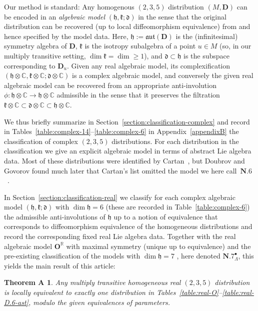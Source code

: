 \documentclass[10pt,a4paper]{amsart}
\newtheorem*{theoremA}{Theorem A}
\newcommand{\bbC}{\mathbb{C}}
\newcommand{\bbR}{\mathbb{R}}
\newcommand{\mbD}{\mathbf{D}}
\newcommand{\mbO}{\mathbf{O}}
\newcommand{\mfd} {\mathfrak{d}}
\newcommand{\mfh} {\mathfrak{h}}
\newcommand{\mfk} {\mathfrak{k}}
\newcommand{\mfaut}{\mathfrak{aut}}
\numberwithin{equation}{section}
\begin{document}
Our method is standard: Any homogenous $(2, 3, 5)$ distribution $(M, \mbD)$ can be encoded in an \textit{algebraic model} $(\mfh, \mfk; \mfd)$ in the sense that the original distribution can be recovered (up to local diffeomorphism equivalence) from and hence specified by the model data. Here, $\mfh := \mfaut(\mbD)$ is the (infinitesimal) symmetry algebra of $\mbD$, $\mfk$ is the isotropy subalgebra of a point $u \in M$ (so, in our multiply transitive setting, $\dim \mfk = \dim \geq 1$), and $\mfd \subset \mfh$ is the subspace corresponding to $\mbD_u$. Given any real algebraic model, its complexification $(\mfh \otimes \bbC, \mfk \otimes \bbC; \mfd \otimes \bbC)$ is a complex algebraic model, and conversely the given real algebraic model can be recovered from an appropriate anti-involution $\phi\colon \mfh \otimes \bbC \to \mfh \otimes \bbC$ admissible in the sense that it preserves the filtration $\mfk \otimes \bbC \subset \mfd \otimes \bbC \subset \mfh \otimes \bbC$.

We thus briefly summarize in Section~\ref{section:classification-complex} and record in Tables~\ref{table:complex-14}--\ref{table:complex-6} in Appendix~\ref{appendixB} the classification of complex $(2, 3, 5)$ distributions. For each distribution in the classification we give an explicit algebraic model in terms of abstract Lie algebra data. Most of these distributions were identified by Cartan~\cite{CartanFiveVariables}, but Doubrov and Govorov found much later that Cartan's list omitted the model we here call~$\mathbf{N.6}$~\cite{DoubrovGovorovCounterexample}.

In Section~\ref{section:classification-real} we classify for each complex algebraic model $(\mfh, \mfk; \mfd)$ with $\dim \mfh = 6$ (these are recorded in Table~\ref{table:complex-6}) the admissible anti-involutions of $\mfh$ up to a notion of equivalence that corresponds to diffeomorphism equivalence of the homogeneous distributions and record the corresponding fixed real Lie algebra data. Together with the real algebraic model $\mbO^{\bbR}$ with maximal symmetry (unique up to equivalence) and the pre-existing classification of the models with $\dim \mfh = 7$ \cite[Theorem~2]{DoubrovZelenko}, here denoted $\mathbf{N.7}_{\Lambda}^{\bullet}$, this yields the main result of this article:


\begin{theoremA}\label{theorem:classification-real} Any multiply transitive homogeneous real $(2, 3, 5)$ distribution is locally equivalent to exactly one distribution in Tables~{\rm \ref{table:real-O}--\ref{table:real-D.6-ast}}, modulo the given equivalences of parameters.
\end{theoremA}
\end{document}
